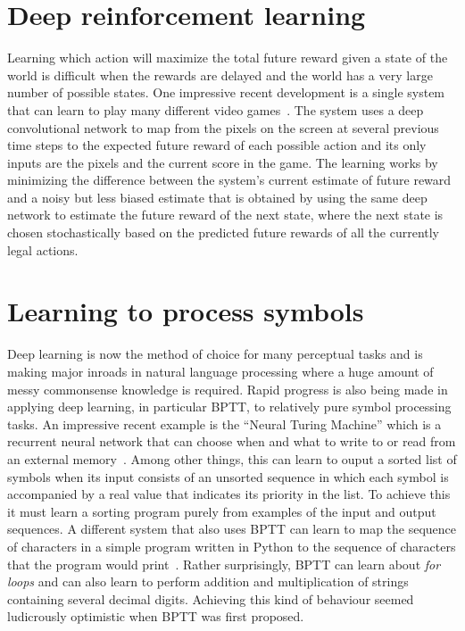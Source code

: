 \documentclass[10pts]{article}
\begin{document}
\section{Deep reinforcement learning}

Learning which action will maximize the total future reward given a state
of the world is difficult when the rewards are delayed and the world has a
very large number of possible states. One impressive recent development is
a single system that can learn to play many different video
games~\citep{Deepmind-atari-arxiv2013}. The system uses a deep convolutional network to
map from the pixels on the screen at several previous time steps to the
expected future reward of each possible action and its only inputs are the
pixels and the current score in the game. The learning works by minimizing
the difference between the system's current estimate of future reward and a
noisy but less biased estimate that is obtained by using the same deep
network to estimate the future reward of the next state, where the next
state is chosen stochastically based on the predicted future rewards of all
the currently legal actions.

\section{Learning to process symbols}

Deep learning is now the method of choice for many perceptual tasks and is
making major inroads in natural language processing where a huge amount of
messy commonsense knowledge is required. Rapid progress is also being made
in applying deep learning, in particular BPTT, to relatively pure symbol processing tasks.
An impressive recent example is the ``Neural Turing Machine'' which is a
recurrent neural network that can choose when and what to write to or read
from an external memory~\citep{Graves-et-al-arxiv2014}. 
Among other things, this can learn to
ouput a sorted list of symbols when its input consists of an unsorted
sequence in which each symbol is accompanied by a real value that indicates
its priority in the list.  To achieve this it must learn a sorting program
purely from examples of the input and output sequences.  A different system
that also uses BPTT can learn to map the sequence of characters in a simple
program written in Python to the sequence of characters that the program
would print~\citep{Zaremba+Sutskever-arxiv2014}. 
Rather surprisingly, BPTT can learn about {\it for
  loops} and can also learn to perform addition and multiplication of
strings containing several decimal digits. Achieving this kind of behaviour
seemed ludicrously optimistic when BPTT was first proposed.
  
\end{document}

